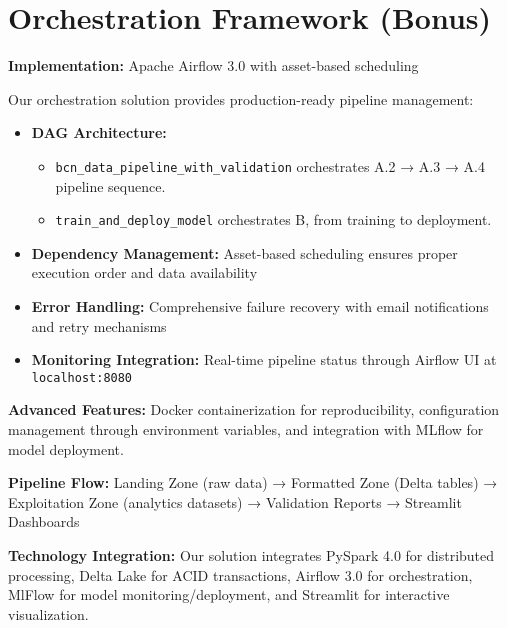 
\section{Orchestration Framework (Bonus)}

\textbf{Implementation:} Apache Airflow 3.0 with asset-based scheduling

Our orchestration solution provides production-ready pipeline management:

\begin{itemize}[nosep]
\item \textbf{DAG Architecture:} 
\begin{itemize}
    \item \texttt{bcn\_data\_pipeline\_with\_validation} orchestrates A.2 → A.3 → A.4 pipeline sequence.
    \item \texttt{train\_and\_deploy\_model} orchestrates B, from training to deployment.
\end{itemize}

\item \textbf{Dependency Management:} Asset-based scheduling ensures proper execution order and data availability
\item \textbf{Error Handling:} Comprehensive failure recovery with email notifications and retry mechanisms
\item \textbf{Monitoring Integration:} Real-time pipeline status through Airflow UI at \texttt{localhost:8080}
\end{itemize}

\textbf{Advanced Features:} Docker containerization for reproducibility, configuration management through environment variables, and integration with MLflow for model deployment.

\textbf{Pipeline Flow:} Landing Zone (raw data) → Formatted Zone (Delta tables) → Exploitation Zone (analytics datasets) → Validation Reports → Streamlit Dashboards

\textbf{Technology Integration:} Our solution integrates PySpark 4.0 for distributed processing, Delta Lake for ACID transactions, Airflow 3.0 for orchestration, MlFlow for model monitoring/deployment, and Streamlit for interactive visualization.